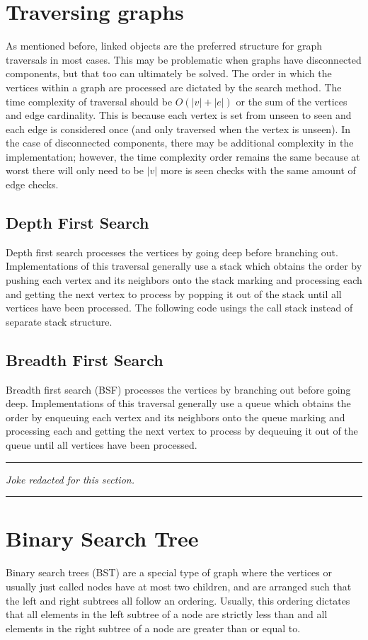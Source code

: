 \documentclass[letterpaper, 10pt]{article}
\begin{document}
\section{Traversing graphs}
As mentioned before, linked objects are the preferred structure for graph traversals in most cases. This may
be problematic when graphs have disconnected components, but that too can ultimately be solved. The order
in which the vertices within a graph are processed are dictated by the search method. The time complexity
of traversal should be \(O(|v| + |e|)\) or the sum of the vertices and edge cardinality. This is because each
vertex is set from unseen to seen and each edge is considered once (and only traversed when the vertex is unseen).
In the case of disconnected components, there may be additional complexity in the implementation; however, the
time complexity order remains the same because at worst there will only need to be \(|v|\) more is seen checks with
the same amount of edge checks.
\subsection{Depth First Search}
Depth first search processes the vertices by going deep before branching out.
Implementations of this traversal generally use a stack which obtains the order by pushing
each vertex and its neighbors onto the stack marking and processing each and getting the next
vertex to process by popping it out of the stack until all vertices have been processed. The following code
usings the call stack instead of separate stack structure.
\subsection{Breadth First Search}
Breadth first search (BSF) processes the vertices by branching out before going deep.
Implementations of this traversal generally use a queue which obtains the order by enqueuing
each vertex and its neighbors onto the queue marking and processing each and getting the next
vertex to process by dequeuing it out of the queue until all vertices have been processed.
\vspace{.25cm}
\hrule
\vspace{.25cm}
\noindent
\textit{Joke redacted for this section.}\\
\hrule
\vspace{1cm}

\section{Binary Search Tree}
Binary search trees (BST) are a special type of graph where the vertices or usually just called nodes 
have at most two children, and
are arranged such that the left and right subtrees all follow an ordering. Usually, this ordering
dictates that all elements in the left subtree of a node are strictly less than and all elements in the right
subtree of a node are greater than or equal to.
\end{document}
